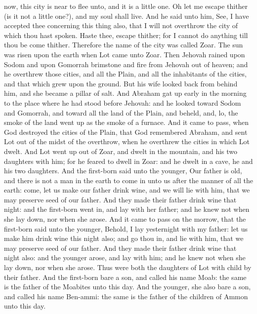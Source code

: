 now, this city is near to flee unto, and it is a little one. Oh let me escape thither (is it not a little one?), and my soul shall live. And he said unto him, See, I have accepted thee concerning this thing also, that I will not overthrow the city of which thou hast spoken. Haste thee, escape thither; for I cannot do anything till thou be come thither. Therefore the name of the city was called Zoar.  The sun was risen upon the earth when Lot came unto Zoar. Then Jehovah rained upon Sodom and upon Gomorrah brimstone and fire from Jehovah out of heaven; and he overthrew those cities, and all the Plain, and all the inhabitants of the cities, and that which grew upon the ground. But his wife looked back from behind him, and she became a pillar of salt. And Abraham gat up early in the morning to the place where he had stood before Jehovah: and he looked toward Sodom and Gomorrah, and toward all the land of the Plain, and beheld, and, lo, the smoke of the land went up as the smoke of a furnace.  And it came to pass, when God destroyed the cities of the Plain, that God remembered Abraham, and sent Lot out of the midst of the overthrow, when he overthrew the cities in which Lot dwelt.  And Lot went up out of Zoar, and dwelt in the mountain, and his two daughters with him; for he feared to dwell in Zoar: and he dwelt in a cave, he and his two daughters. And the first-born said unto the younger, Our father is old, and there is not a man in the earth to come in unto us after the manner of all the earth: come, let us make our father drink wine, and we will lie with him, that we may preserve seed of our father. And they made their father drink wine that night: and the first-born went in, and lay with her father; and he knew not when she lay down, nor when she arose. And it came to pass on the morrow, that the first-born said unto the younger, Behold, I lay yesternight with my father: let us make him drink wine this night also; and go thou in, and lie with him, that we may preserve seed of our father. And they made their father drink wine that night also: and the younger arose, and lay with him; and he knew not when she lay down, nor when she arose. Thus were both the daughters of Lot with child by their father. And the first-born bare a son, and called his name Moab: the same is the father of the Moabites unto this day. And the younger, she also bare a son, and called his name Ben-ammi: the same is the father of the children of Ammon unto this day. 

